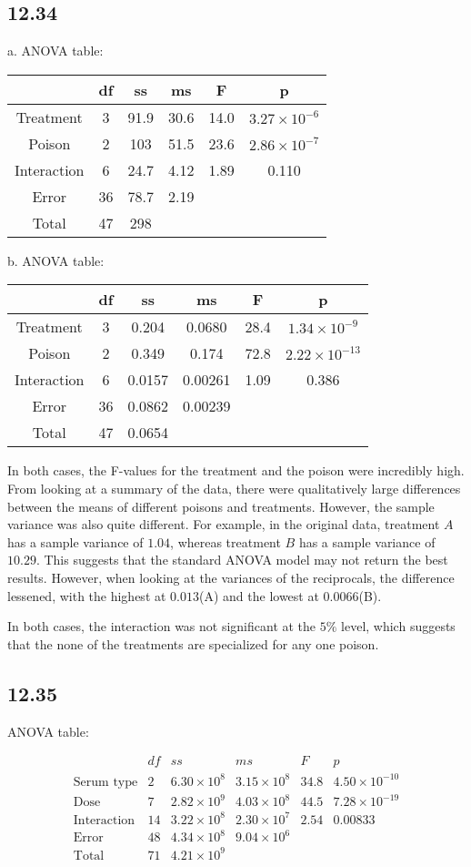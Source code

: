 \documentclass{article}
\begin{document}
\subsection*{12.34}
a. ANOVA table:

\begin{tabular}{cccccc}
&df&ss&ms&F&p\\
\hline
Treatment&3&91.9&30.6&14.0&$3.27\times10^{-6}$\\
Poison&2&103&51.5&23.6&$2.86\times10^{-7}$\\
Interaction&6&24.7&4.12&1.89&0.110\\
Error&36&78.7&2.19\\
Total&47&298\\
\end{tabular}

b. ANOVA table:

\begin{tabular}{cccccc}
&df&ss&ms&F&p\\
\hline
Treatment&3&0.204&0.0680&28.4&$1.34\times10^{-9}$\\
Poison&2&0.349&0.174&72.8&$2.22\times10^{-13}$\\
Interaction&6&0.0157&0.00261&1.09&0.386\\
Error&36&0.0862&0.00239\\
Total&47&0.0654\\
\end{tabular}

In both cases, the F-values for the treatment and the poison were incredibly high. From looking at a summary of the data, there were qualitatively large differences between the means of different poisons and treatments. However, the sample variance was also quite different. For example, in the original data, treatment $A$ has a sample variance of $1.04$, whereas treatment $B$ has a sample variance of $10.29$. This suggests that the standard ANOVA model may not return the best results. However, when looking at the variances of the reciprocals, the difference lessened, with the highest at $0.013$(A) and the lowest at $0.0066$(B). 

In both cases, the interaction was not significant at the $5\%$ level, which suggests that the none of the treatments are specialized for any one poison.
\subsection*{12.35}
ANOVA table:

$$\begin{array}{c|ccccc}
&df&ss&ms&F&p\\
\hline
\text{Serum type}&2&6.30\times10^8&3.15\times10^8&34.8&4.50\times10^{-10}\\
\text{Dose}&7&2.82\times10^9&4.03\times10^8&44.5&7.28\times10^{-19}\\
\text{Interaction}&14&3.22\times10^8&2.30\times10^7&2.54&0.00833\\
\text{Error}&48&4.34\times10^8&9.04\times10^6\\
\text{Total}&71&4.21\times10^9\\
\end{array}$$
\end{document}
